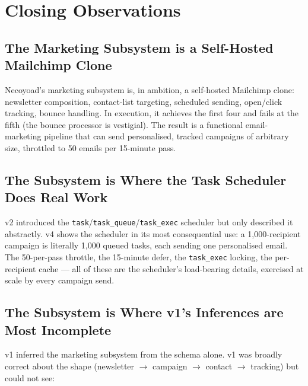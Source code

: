 \documentclass[11pt,a4paper]{article}
\begin{document}
\section{Closing Observations}\label{sec:observations}

\subsection{The Marketing Subsystem is a Self-Hosted Mailchimp Clone}

Necoyoad's marketing subsystem is, in ambition, a self-hosted
Mailchimp clone: newsletter composition, contact-list targeting,
scheduled sending, open/click tracking, bounce handling. In
execution, it achieves the first four and fails at the fifth (the
bounce processor is vestigial). The result is a functional
email-marketing pipeline that can send personalised, tracked
campaigns of arbitrary size, throttled to 50 emails per 15-minute
pass.

\subsection{The Subsystem is Where the Task Scheduler Does Real Work}

v2 introduced the \texttt{task}/\texttt{task\_queue}/\texttt{task\_exec}
scheduler but only described it abstractly. v4 shows the scheduler
in its most consequential use: a 1,000-recipient campaign is
literally 1,000 queued tasks, each sending one personalised email.
The 50-per-pass throttle, the 15-minute defer, the
\texttt{task\_exec} locking, the per-recipient cache --- all of
these are the scheduler's load-bearing details, exercised at scale
by every campaign send.

\subsection{The Subsystem is Where v1's Inferences are Most Incomplete}

v1 inferred the marketing subsystem from the schema alone. v1 was
broadly correct about the shape (newsletter $\to$ campaign $\to$
contact $\to$ tracking) but could not see:
\end{document}
